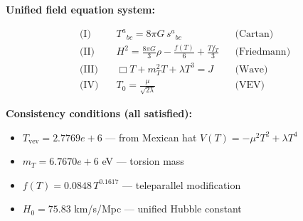 
\textbf{Unified field equation system:}

\begin{align}
  \text{(I)} \quad & T^a{}_{bc} = 8\pi G \, s^a{}_{bc} && \text{(Cartan)} \\
  \text{(II)} \quad & H^2 = \frac{8\pi G}{3}\rho - \frac{f(T)}{6} + \frac{Tf_T}{3} && \text{(Friedmann)} \\
  \text{(III)} \quad & \Box T + m_T^2 T + \lambda T^3 = J && \text{(Wave)} \\
  \text{(IV)} \quad & T_0 = \frac{\mu}{\sqrt{2\lambda}} && \text{(VEV)}
\end{align}

\textbf{Consistency conditions (all satisfied):}
\begin{itemize}
  \item $T_{\text{vev}} = 2.7769e+6$ — from Mexican hat $V(T) = -\mu^2 T^2 + \lambda T^4$
  \item $m_T = 6.7670e+6$ eV — torsion mass
  \item $f(T) = 0.0848 \, T^{0.1617}$ — teleparallel modification
  \item $H_0 = 75.83$ km/s/Mpc — unified Hubble constant
\end{itemize}
